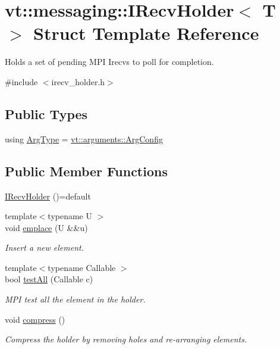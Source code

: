 \hypertarget{structvt_1_1messaging_1_1_i_recv_holder}{}\section{vt\+:\+:messaging\+:\+:I\+Recv\+Holder$<$ T $>$ Struct Template Reference}
\label{structvt_1_1messaging_1_1_i_recv_holder}


Holds a set of pending M\+PI Irecvs to poll for completion.  




{\ttfamily \#include $<$irecv\+\_\+holder.\+h$>$}

\subsection*{Public Types}
\begin{DoxyCompactItemize}
\item 
using \hyperlink{structvt_1_1messaging_1_1_i_recv_holder_aae9327cb1e82d6aee682457739dad4b5}{Arg\+Type} = \hyperlink{structvt_1_1arguments_1_1_arg_config}{vt\+::arguments\+::\+Arg\+Config}
\end{DoxyCompactItemize}
\subsection*{Public Member Functions}
\begin{DoxyCompactItemize}
\item 
\hyperlink{structvt_1_1messaging_1_1_i_recv_holder_a709a349d723247b10bf57ca2831bfe19}{I\+Recv\+Holder} ()=default
\item 
{\footnotesize template$<$typename U $>$ }\\void \hyperlink{structvt_1_1messaging_1_1_i_recv_holder_ab81d251a84cb2c8366eb5f5052ce002c}{emplace} (U \&\&u)
\begin{DoxyCompactList}\small\item\em Insert a new element. \end{DoxyCompactList}\item 
{\footnotesize template$<$typename Callable $>$ }\\bool \hyperlink{structvt_1_1messaging_1_1_i_recv_holder_a5c25ae9371ef928b00c42405d9d00a38}{test\+All} (Callable c)
\begin{DoxyCompactList}\small\item\em M\+PI test all the element in the holder. \end{DoxyCompactList}\item 
void \hyperlink{structvt_1_1messaging_1_1_i_recv_holder_acfbf80c561c8aa8e75d27d2ee2892b09}{compress} ()
\begin{DoxyCompactList}\small\item\em Compress the holder by removing holes and re-\/arranging elements. \end{DoxyCompactList}\end{DoxyCompactItemize}


